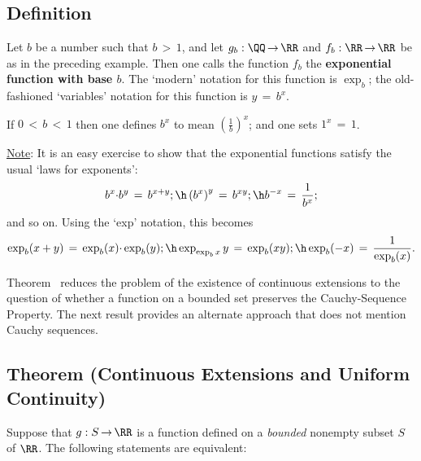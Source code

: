 \V

            \subsection{\small{\bf Definition}}
            \label{DefF20.110}

        Let $b$ be a number such that $b\,>\,1$, and let $g_{b}:{\QQ} \,{\rightarrow}\, {\RR}$ and $f_{b}:{\RR} \,{\rightarrow}\, {\RR}$ be as in the preceding example.
    Then one calls the function $f_{b}$ the {\bf exponential function with base $b$}.
    The `modern' notation for this function is $\exp_{b}$; the old-fashioned `variables' notation for this function is $y \,=\, b^{x}$.

        If $0\,<\,b\,<\,1$ then one defines $b^{x}$ to mean ${\displaystyle \left(\frac{1}{b}\right)^{x}}$; and one sets $1^{x} \,=\, 1$.


\V

        \underline{Note}: It is an easy exercise to show that the exponential functions satisfy the usual `laws for exponents':
        \begin{displaymath}
        b^{x}{\cdot}b^{y} \,=\, b^{x+y}; \h \left(b^{x}\right)^{y} \,=\, b^{xy};
    \h b^{-x} \,=\, \frac{1}{b^{x}};
        \end{displaymath}
    and so on. Using the `exp' notation, this becomes
        \begin{displaymath}
        \exp_{b}(x+y) \,=\, \exp_{b}(x){\cdot}\exp_{b}(y); \h \exp_{\exp_{b}x}y \,=\, \exp_{b}(xy); \h \exp_{b}(-x) \,=\, \frac{1}{\exp_{b}(x)}.
        \end{displaymath}

\V
\V


        Theorem~ reduces the problem of the existence of continuous extensions
    to the question of whether a function on a bounded set preserves the Cauchy-Sequence Property.
    The next result provides an alternate approach that does not mention Cauchy sequences.

\V


            \subsection{\small{\bf Theorem} (Continuous Extensions and Uniform Continuity)}
            \label{ThmF20.120}

        Suppose that $g:S \,{\rightarrow}\, {\RR}$ is a function defined on a {\em bounded} nonempty subset $S$ of ${\RR}$.
    The following statements are equivalent:

